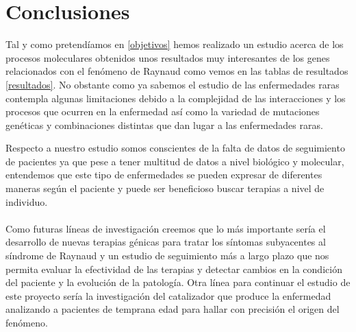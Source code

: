 \section{Conclusiones}

Tal y como pretendíamos en \ref{objetivos} hemos realizado un estudio acerca de los procesos moleculares obtenidos unos resultados muy interesantes de los genes relacionados con el fenómeno de Raynaud como vemos en las tablas de resultados \ref{resultados}. No obstante como ya sabemos el estudio de las enfermedades raras contempla algunas limitaciones debido a la complejidad de las interacciones y los procesos que ocurren en la enfermedad así como la variedad de mutaciones genéticas y combinaciones distintas que dan lugar a las enfermedades raras.

Respecto a nuestro estudio somos conscientes de la falta de datos de seguimiento de pacientes ya que pese a tener multitud de datos a nivel biológico y molecular, entendemos que este tipo de enfermedades se pueden expresar de diferentes maneras según el paciente y puede ser beneficioso buscar terapias a nivel de individuo. \\
\\
Como futuras líneas de investigación creemos que lo más importante sería el desarrollo de nuevas terapias génicas para tratar los síntomas subyacentes al síndrome de Raynaud y un estudio de seguimiento más a largo plazo que nos permita evaluar la efectividad de las terapias y detectar cambios en la condición del paciente y la evolución de la patología. Otra línea para continuar el estudio de este proyecto sería la investigación del catalizador que produce la enfermedad analizando a pacientes de temprana edad para hallar con precisión el origen del fenómeno.